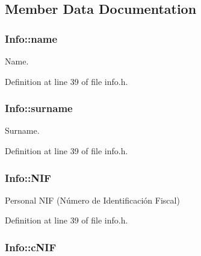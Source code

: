 \subsection{Member Data Documentation}
\hypertarget{struct_info_abedda733b9fd73013c473e3873dff857}{
\subsubsection[{name}]{\setlength{\rightskip}{0pt plus 5cm}Info\+::name}}\label{struct_info_abedda733b9fd73013c473e3873dff857}


Name. 



Definition at line 39 of file info.\+h.

\hypertarget{struct_info_a7c380abfc7270f0c19ea6bc4db4c89a9}{
\subsubsection[{surname}]{\setlength{\rightskip}{0pt plus 5cm}Info\+::surname}}\label{struct_info_a7c380abfc7270f0c19ea6bc4db4c89a9}


Surname. 



Definition at line 39 of file info.\+h.

\hypertarget{struct_info_a81aa1db72f631011ba7426099479f35c}{
\subsubsection[{N\+I\+F}]{\setlength{\rightskip}{0pt plus 5cm}Info\+::\+N\+I\+F}}\label{struct_info_a81aa1db72f631011ba7426099479f35c}


Personal N\+I\+F (Número de Identificación Fiscal) 



Definition at line 39 of file info.\+h.

\hypertarget{struct_info_a49fbb11aff87b66c956560ec2bc31df4}{
\subsubsection[{c\+N\+I\+F}]{\setlength{\rightskip}{0pt plus 5cm}Info\+::c\+N\+I\+F}}\label{struct_info_a49fbb11aff87b66c956560ec2bc31df4}


